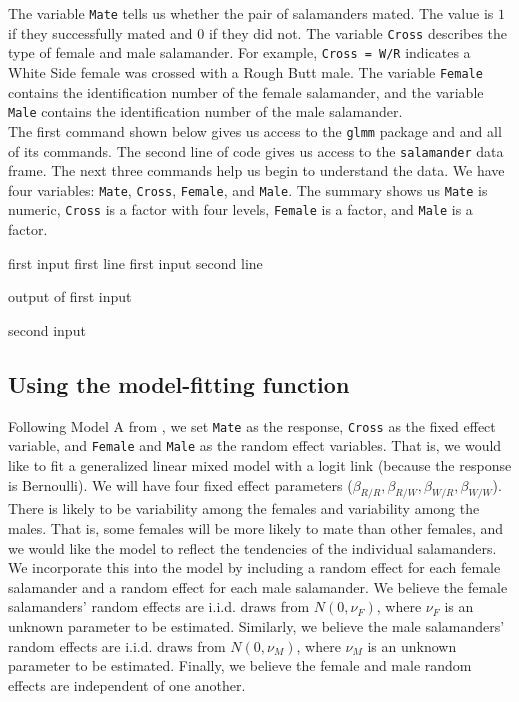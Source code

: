 \documentclass[article]{jss}
\begin{document}
The variable \texttt{Mate} tells us whether the pair of salamanders mated. The value is $1$ if they successfully mated and $0$ if they did not. The variable \texttt{Cross} describes the type of female and male salamander. For example, \texttt{Cross = W/R} indicates a White Side female was crossed with a Rough Butt male. The variable \texttt{Female} contains the identification number of the female salamander, and the variable \texttt{Male} contains the identification number of the male salamander.\\ 

The first   command shown below gives us access to the \texttt{glmm} package and and all of its commands. The second line of code gives us access to the \texttt{salamander} data frame.  The next three commands help us begin to understand the data. We have four variables: \texttt{Mate}, \texttt{Cross}, \texttt{Female}, and \texttt{Male}. The summary shows us \texttt{Mate} is numeric, \texttt{Cross} is a factor with four levels, \texttt{Female} is a factor, and \texttt{Male} is a factor. 

\begin{CodeChunk}
\begin{CodeInput}
first input first line
first input second line
\end{CodeInput}
\begin{CodeOutput}
output of first input
\end{CodeOutput}
\begin{CodeInput}
second input
\end{CodeInput}
\end{CodeChunk}


\subsection{Using the model-fitting function}

  Following Model A from \citet{karim:zeger:1992}, we set \texttt{Mate} as the response, \texttt{Cross} as the fixed effect variable, and \texttt{Female} and \texttt{Male} as the random effect variables. That is, we would like to fit a generalized linear mixed model with a logit link (because the response is Bernoulli). We will have four fixed effect parameters ($\beta_{R/R}, \beta_{R/W},\beta_{W/R},\beta_{W/W}$). There is likely to be variability among the females and variability among the males. That is, some females will be more likely to mate than other females, and we would like the model to reflect the tendencies of the individual salamanders. We incorporate this into the model by including a random effect for each female salamander and a random effect for each male salamander. We believe the female salamanders' random effects are i.i.d. draws from $N(0, \nu_F)$, where $\nu_F$ is an unknown parameter to be estimated. Similarly, we believe the male salamanders' random effects are i.i.d. draws from $N(0,\nu_M)$, where $\nu_M$ is an unknown parameter to be estimated. Finally, we believe the female and male random effects are independent of one another. \\
\end{document}
